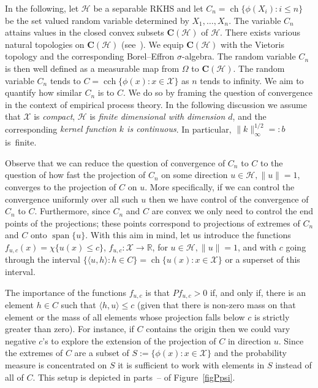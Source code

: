 \documentclass[AHL,Unicode,longabstracts,published]{cedram}
\theoremstyle{remark}
\DeclareMathOperator{\cch}{cch}
\DeclareMathOperator{\ch}{ch}
\DeclareMathOperator{\spn}{span}
\newcommand{\R}{\mathbb{R}}
\newcommand{\bfC}{\mathbf{C}}
\newcommand{\X}{\mathcal{X}}
\newcommand{\cH}{\mathcal{H}}
\begin{document}
In the following, let $\cH$ be a separable RKHS and let $C_n = \ch \{\phi(X_i) : i \leq n \}$ be the set valued random variable determined by $X_1,\dots, X_n$. The variable $C_n$ attains values in the closed convex subsets $\bfC(\cH)$ of $\cH$. There exists various natural topologies on $\bfC(\cH)$ (see~\cite{BEER93}). We equip $\bfC(\cH)$ with the Vietoris topology and the corresponding Borel--Effron $\sigma$-algebra. The random variable $C_n$ is then well defined as a measurable map from $\Omega$ to $\bfC(\cH)$. The random variable $C_n$ tends to $C = \cch\{ \phi(x) : x \in \X \}$ as $n$ tends to infinity. We aim to quantify how similar $C_n$ is to $C$. We do so by framing the question of convergence in the context of empirical process theory. In the following discussion we assume that $\X$ is \emph{compact}, $\cH$ is \emph{finite dimensional with dimension $d$}, and the corresponding \emph{kernel function $k$ is continuous}. In particular, $\|k\|_\infty^{1/2} =: b$ is~finite.

Observe that we can reduce the question of convergence of $C_n$ to $C$ to the question of how fast the projection of $C_n$ on some direction $u \in \cH, \|u\| =1$, converges to the projection of $C$ on $u$. More specifically, if we can control the convergence uniformly over all such $u$ then we have control of the convergence of $C_n$ to $C$. Furthermore, since $C_n$ and $C$ are convex we only need to control the end points of the projections; these points correspond to projections of extremes of $C_n$ and $C$ onto $\spn\{u\}$. With this aim in mind, let us introduce the functions $f_{u,c}(x)=\chi\{ u(x) \leq c \}$, $f_{u,c} : \X \rightarrow \R$, for $u\in \cH, \|u\| =1$, and with $c$ going through the interval $\{\langle u, h \rangle : h\in C \} = \ch \{ u(x) : x \in \X \}$ or a superset of this interval.

The importance of the functions $f_{u,c}$ is that $P f_{u,c} > 0$ if, and only if, there is an element $h\in C$ such that $\langle h,u \rangle \leq c$ (given that there is non-zero mass on that element or the mass of all elements whose projection falls below $c$ is strictly greater than zero). For instance, if $C$ contains the origin then we could vary negative $c$'s to explore the extension of the projection of $C$ in direction $u$. Since the extremes of $C$ are a subset of $S := \{ \phi(x) : x \in \X\}$ and the probability measure is concentrated on $S$ it is sufficient to work with elements in $S$ instead of all of $C$. This setup is depicted in parts~-- of Figure~\ref{figPpsi}.
\end{document}
